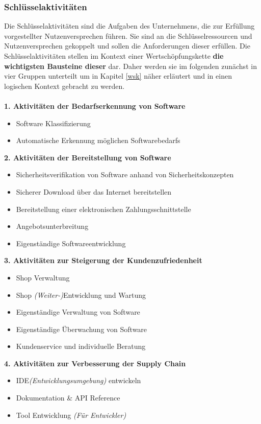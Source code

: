 \subsubsection{Schlüsselaktivitäten}\label{key_activities}
Die Schlüsselaktivitäten sind die Aufgaben des Unternehmens, die zur Erfüllung vorgestellter Nutzenversprechen führen. Sie sind an die Schlüsselressourcen und Nutzenversprechen gekoppelt und sollen die Anforderungen dieser erfüllen. Die Schlüsselaktivitäten stellen im Kontext einer Wertschöpfungskette \textbf{die wichtigsten Bausteine dieser} dar. Daher werden sie im folgenden zunächst in vier Gruppen unterteilt um in Kapitel \ref{wsk} näher erläutert und in einen logischen Kontext gebracht zu werden.\\\\
\textbf{1. Aktivitäten der Bedarfserkennung von Software}
\begin{itemize}
	\item Software Klassifizierung
	\item Automatische Erkennung möglichen Softwarebedarfs
\end{itemize}
\vspace{0.2cm}
\textbf{2. Aktivitäten der Bereitstellung von Software}
\begin{itemize}
	\item Sicherheitsverifikation von Software anhand von Sicherheitskonzepten
	\item Sicherer Download über das Internet bereitstellen
	\item Bereitstellung einer elektronischen Zahlungsschnittstelle
	\item Angebotsunterbreitung
	\item Eigenständige Softwareentwicklung
\end{itemize}
\vspace{0.2cm}
\textbf{3. Aktivitäten zur Steigerung der Kundenzufriedenheit}
\begin{itemize}
	\item Shop Verwaltung
	\item Shop \textit{(Weiter-)}Entwicklung und Wartung
	\item Eigenständige Verwaltung von Software
	\item Eigenständige Überwachung von Software
	\item Kundenservice und individuelle Beratung
\end{itemize}
\vspace{0.2cm}
\textbf{4. Aktivitäten zur Verbesserung der Supply Chain}
\begin{itemize}
	\item IDE\textit{(Entwicklungsumgebung)} entwickeln
	\item Dokumentation \& API Reference
	\item Tool Entwicklung \textit{(Für Entwickler)}
\end{itemize}

